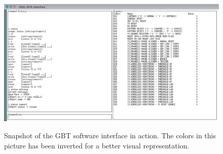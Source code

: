\documentclass[main.tex]{subfiles}
\begin{document}
\begin{figure} %
\includegraphics[width=\linewidth, trim={6mm 0 0 11mm},clip,angle=90]{../img/gbt_gui_inv.png}  \\[0.1 cm]
\caption{Snapshot of the GBT software interface in action. The colors in this picture has been inverted for a better visual representation.}
\label{fig:gbtgui}
\end{figure}


\end{document}
